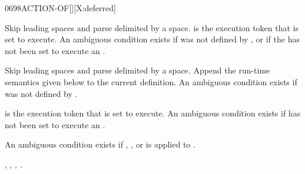 \begin{worddef}{0698}{ACTION-OF}[][X:deferred]
\interpret

	Skip leading spaces and parse  delimited by a space.
	 is the execution token that  is set to execute.
	An ambiguous condition exists if  was not defined by
	, or if the  has not been set to execute an
	.

\compile

	Skip leading spaces and parse  delimited by a space.
	Append the run-time semantics given below to the current
	definition.  An ambiguous condition exists if 
	was not defined by .

\runtime

	 is the execution token that  is set to execute.
	An ambiguous condition exists if  has not been
	set to execute an .

	An ambiguous condition exists if , \word{[COMPILE]},
	\word{[']} or  is applied to .

\see {},
	,
	,
	.

	\begin{implement} %
		\word{:}  \\
		\tab {}   \\
		\tab[2]  \word{[']}   \\
		\tab {} \\
		\tab[2]   \\
		\tab {} \word{;} 
	\end{implement}

	\begin{testing} %
		 \\

		 \\
		 \\
		 \\

		 \\
		 \\
		 \\
	\end{testing}
\end{worddef}



